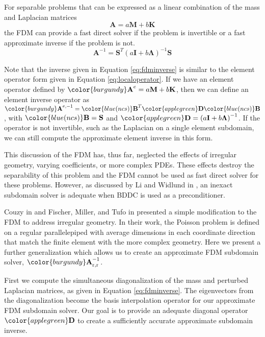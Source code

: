 For separable problems that can be expressed as a linear combination of the mass and Laplacian matrices
\begin{equation}
\mathbf{A} = a \mathbf{M} + b \mathbf{K}
\end{equation}
the FDM can provide a fast direct solver if the problem is invertible or a fast approximate inverse if the problem is not.
\begin{equation}
\mathbf{A}^{-1} = \mathbf{S}^T \left( a \mathbf{I} + b \boldsymbol{\Lambda} \right)^{-1} \mathbf{S}
\label{eq:fdminverse}
\end{equation}

Note that the inverse given in Equation \ref{eq:fdminverse} is similar to the element operator form given in Equation \ref{eq:localoperator}.
If we have an element operator defined by ${\color{burgundy}\mathbf{A}}^e = a \mathbf{M} + b \mathbf{K}$, then we can define an element inverse operator as ${\color{burgundy}\mathbf{A}}^{e, -1} = {\color{blue(ncs)}\mathbf{B}}^T {\color{applegreen}\mathbf{D}} {\color{blue(ncs)}\mathbf{B}}$, with ${\color{blue(ncs)}\mathbf{B}} = \mathbf{S}$ and ${\color{applegreen}\mathbf{D}} = \left( a \mathbf{I} + b \boldsymbol{\Lambda} \right)^{-1}$.
If the operator is not invertible, such as the Laplacian on a single element subdomain, we can still compute the approximate element inverse in this form.

This discussion of the FDM has, thus far, neglected the effects of irregular geometry, varying coefficients, or more complex PDEs.
These effects destroy the separability of this problem and the FDM cannot be used as fast direct solver for these problems.
However, as discussed by Li and Widlund in \cite{li2007use}, an inexact subdomain solver is adequate when BDDC is used as a preconditioner.

Couzy in \cite{couzy1995spectral} and Fischer, Miller, and Tufo in \cite{fischer2000overlapping} presented a simple modification to the FDM to address irregular geometry.
In their work, the Poisson problem is defined on a regular parallelepiped with average dimensions in each coordinate direction that match the finite element with the more complex geometry.
Here we present a further generalization which allows us to create an approximate FDM subdomain solver, ${\color{burgundy}\mathbf{A}}_{\text{r}, \text{r}}^{-1}$.

First we compute the simultaneous diagonalization of the mass and perturbed Laplacian matrices, as given in Equation \ref{eq:fdminverse}.
The eigenvectors from the diagonalization become the basis interpolation operator for our approximate FDM subdomain solver.
Our goal is to provide an adequate diagonal operator ${\color{applegreen}\mathbf{D}}$ to create a sufficiently accurate approximate subdomain inverse.


